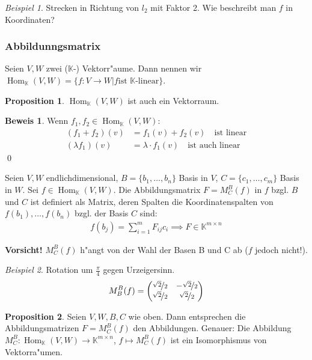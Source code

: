 \documentclass[11pt]{article}
\DeclareMathOperator{\mHom}{Hom}
\theoremstyle{remark}
\newtheorem{exa}{Beispiel}[section]
\theoremstyle{definition}
\newtheorem{prof}{Beweis}
\newtheorem*{proposition}{Proposition}
\theoremstyle{remark}
\begin{document}
\begin{exa}
Strecken in Richtung von \(l_2\) mit Faktor 2. Wie beschreibt man \(f\) in
Koordinaten?
\end{exa}

\subsubsection{Abbildunngsmatrix}
\begin{definition}{}{}
Seien \(V,W\) zwei (\(\mathbb{K}\)-) Vektorr"aume. Dann nennen wir
\(\mHom_\mathbb{K}(V,W) = \{f: V\to W | f \text{ist }\mathbb{K}\text{-linear}\}\).
\end{definition}
\begin{proposition}
\(\mHom_\mathbb{K}(V,W)\) ist auch ein Vektorraum.
\end{proposition}
\begin{prof}
Wenn \(f_1, f_2 \in \mHom_\mathbb{K}(V,W)\):
\begin{align*}
(f_1 + f_2)(v) &= f_1(v) + f_2(v) \quad\text{ist linear} \\
(\lambda f_1)(v) &= \lambda\cdot f_1(v)\quad\text{ist auch linear}
\end{align*}
\qed
\end{prof}

Seien \(V, W\) endlichdimensional, \(B = \{b_1, \dots, b_n\}\) Basis in \(V\), \(C = \{c_1, \dots, c_m\}\) Basis in \(W\). Sei \(f \in \mHom_\mathbb{K}(V,W)\). Die Abbildungsmatrix \(F= M_C^B(f)\) in \(f\) bzgl. \(B\) und \(C\) ist definiert als
Matrix, deren Spalten die Koordinatenspalten von \(f(b_1),\dots, f(b_n)\) bzgl. der Basis \(C\) sind:
\begin{align*}
f(b_j) = \sum_{i=1}^mF_{ij}c_i \implies F \in \mathbb{K}^{m\times n}
\end{align*}

\textbf{Vorsicht!} \(M_C^B(f)\) h"angt von der Wahl der Basen B und C ab (\(f\) jedoch nicht!).

\begin{exa}
Rotation um \(\frac{\pi}{4}\) gegen Urzeigersinn.
\begin{align*}
M_B^B(f) = \begin{pmatrix}
\nicefrac{\sqrt{2}}{2} & -\nicefrac{\sqrt{2}}{2}\\
\nicefrac{\sqrt{2}}{2} & \nicefrac{\sqrt{2}}{2}
\end{pmatrix}
\end{align*}
\end{exa}

\begin{proposition} Seien \(V,W,B,C\) wie oben. Dann entsprechen die Abbildungsmatrizen
 \(F = M_C^B(f)\) den Abbildungen.  Genauer: Die Abbildung \(M_C^B: \mHom_\mathbb{K}(V,W)\to\mathbb{K}^{m\times n}\), \(f \mapsto M_C^B(f)\) ist ein Isomorphismus von
 Vektorra"umen.
\end{proposition}
\end{document}

